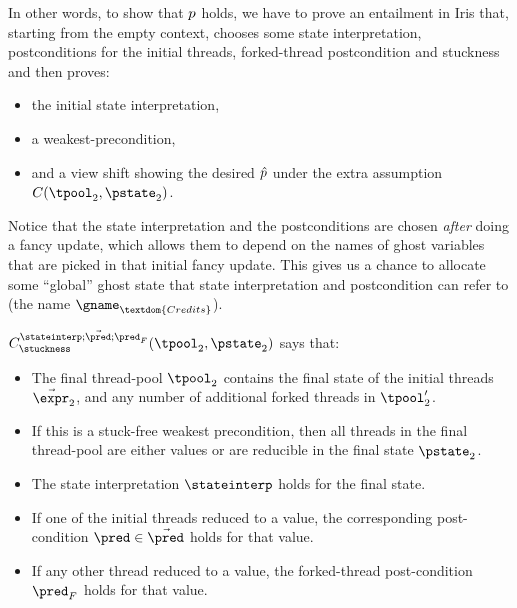 In other words, to show that $p$ holds, we have to prove an entailment in Iris that, starting from the empty context, chooses some state interpretation, postconditions for the initial threads, forked-thread postcondition and stuckness and then proves:
\begin{itemize}
  \item the initial state interpretation,
  \item a weakest-precondition,
  \item and a view shift showing the desired $\hat{p}$ under the extra assumption $\consstate(\tpool_2, \pstate_2)$.
\end{itemize}
Notice that the state interpretation and the postconditions are chosen \emph{after} doing a fancy update, which allows them to depend on the names of ghost variables that are picked in that initial fancy update.
This gives us a chance to allocate some ``global'' ghost state that state interpretation and postcondition can refer to (\eg the name $\gname_{\textdom{Credits}}$).

$\consstate^{\stateinterp;\vec\pred;\pred_F}_{\stuckness}(\tpool_2, \pstate_2)$ says that:
\begin{itemize}
\item The final thread-pool $\tpool_2$ contains the final state of the initial threads $\vec\expr_2$, and any number of additional forked threads in $\tpool_2'$.
\item If this is a stuck-free weakest precondition, then all threads in the final thread-pool are either values or are reducible in the final state $\pstate_2$.
\item The state interpretation $\stateinterp$ holds for the final state.
\item If one of the initial threads reduced to a value, the corresponding post-condition $\pred \in \vec\pred$ holds for that value.
\item If any other thread reduced to a value, the forked-thread post-condition $\pred_F$ holds for that value.
\end{itemize}

~\par

